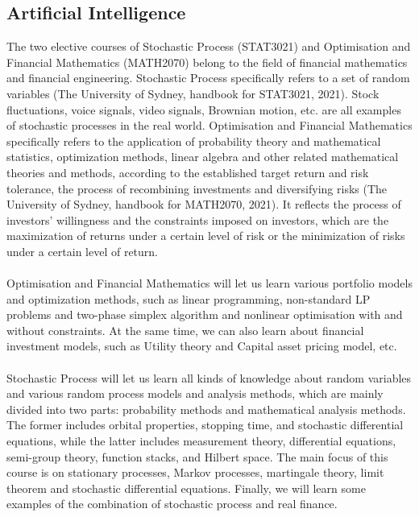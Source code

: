 \documentclass{article}
\begin{document}
	\subsection{Artificial Intelligence}
	The two elective courses of Stochastic Process (STAT3021) and Optimisation and Financial Mathematics (MATH2070) belong to the field of financial mathematics and financial engineering. Stochastic Process specifically refers to a set of random variables (The University of Sydney, handbook for STAT3021, 2021). Stock fluctuations, voice signals, video signals, Brownian motion, etc. are all examples of stochastic processes in the real world. Optimisation and Financial Mathematics specifically refers to the application of probability theory and mathematical statistics, optimization methods, linear algebra and other related mathematical theories and methods, according to the established target return and risk tolerance, the process of recombining investments and diversifying risks (The University of Sydney, handbook for MATH2070, 2021). It reflects the process of investors’ willingness and the constraints imposed on investors, which are the maximization of returns under a certain level of risk or the minimization of risks under a certain level of return.\\
    \\
    Optimisation and Financial Mathematics will let us learn various portfolio models and optimization methods, such as linear programming, non-standard LP problems and two-phase simplex algorithm and nonlinear optimisation with and without constraints. At the same time, we can also learn about financial investment models, such as Utility theory and Capital asset pricing model, etc. \\
    \\
    Stochastic Process will let us learn all kinds of knowledge about random variables and various random process models and analysis methods, which are mainly divided into two parts: probability methods and mathematical analysis methods. The former includes orbital properties, stopping time, and stochastic differential equations, while the latter includes measurement theory, differential equations, semi-group theory, function stacks, and Hilbert space. The main focus of this course is on stationary processes, Markov processes, martingale theory, limit theorem and stochastic differential equations. Finally, we will learn some examples of the combination of stochastic process and real finance.\\
    \\
\end{document}
